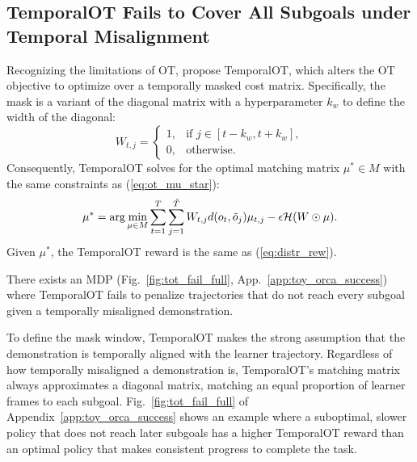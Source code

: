 
\subsection{TemporalOT Fails to Cover All Subgoals under Temporal Misalignment}
\label{subsec:tot_fail}
Recognizing the limitations of OT, \citet{fu2024robot} propose TemporalOT, which alters the OT objective to optimize over a temporally masked cost matrix. 
Specifically, the mask is a variant of the diagonal matrix with a hyperparameter $k_w$ to define the width of the diagonal:
\begin{equation}
    W_{t,j} = 
\begin{cases} 
1, & \text{if } j \in [t - k_w, t + k_w], \\
0, & \text{otherwise}. 
\end{cases}
\end{equation}
Consequently, TemporalOT solves for the optimal matching matrix $\mu^*\in M$ with the same constraints as (\ref{eq:ot_mu_star}):
\begin{equation}\label{eq:tot_mu_star}
\mu^* = \arg\min_{\mu \in M} \sum_{t=1}^{T}\sum_{j=1}^{\tilde{T}} W_{t,j} d(o_t, \tilde{o}_j) \mu_{t,j} - \epsilon \mathcal{H}(W \odot \mu).
\end{equation}
Given $\mu^*$, the TemporalOT reward is the same as (\ref{eq:distr_rew}). 

\begin{counterexample}
There exists an MDP (Fig.~\ref{fig:tot_fail_full}, App.~\ref{app:toy_orca_success}) where TemporalOT fails to penalize trajectories that do not reach every subgoal given a temporally misaligned demonstration.    
\end{counterexample}
To define the mask window, TemporalOT makes the strong assumption that the demonstration is temporally aligned with the learner trajectory. 
Regardless of how temporally misaligned a demonstration is, TemporalOT's matching matrix always approximates a diagonal matrix, matching an equal proportion of learner frames to each subgoal. 
Fig.~\ref{fig:tot_fail_full} of Appendix~\ref{app:toy_orca_success} shows an example where a suboptimal, slower policy that does not reach later subgoals has a higher TemporalOT reward than an optimal policy that makes consistent progress to complete the task. 

